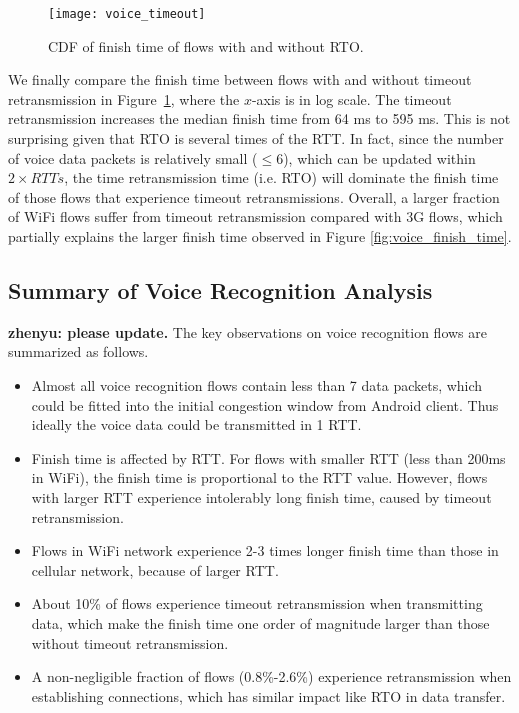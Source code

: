 \begin{figure}[th]
\centering
	\texttt{[image: voice\_timeout]}
\caption{CDF of finish time of flows with and without RTO.}
\label{fig:voice_rto}
\end{figure}

We finally compare the finish time between flows with and without timeout retransmission in Figure~\ref{fig:voice_rto}, where the $x$-axis is in log scale. The timeout retransmission increases the median finish time from 64 ms to 595 ms. This is not surprising given that RTO is several times of the RTT. In fact, since the number of voice data packets is relatively small ($\le 6$), which can be updated within $2\times RTTs$, the time retransmission time (i.e. RTO) will dominate the finish time of those flows that experience timeout retransmissions.  Overall, a larger fraction of WiFi flows suffer from timeout retransmission compared with 3G flows, which partially explains the larger finish time observed in Figure \ref{fig:voice_finish_time}.

\subsection{Summary of Voice Recognition Analysis}

\textbf{zhenyu: please update.}
The key observations on voice recognition flows are summarized as follows.
\begin{itemize}
	\item Almost all voice recognition flows contain less than 7 data packets, which could be fitted into the initial congestion window from Android client. Thus ideally the voice data could be transmitted in 1 RTT.
	\item Finish time is affected by RTT. For flows with smaller RTT (less than 200ms in WiFi), the finish time is proportional to the RTT value. However, flows with larger RTT experience intolerably long finish time, caused by timeout retransmission.
	\item Flows in WiFi network experience 2-3 times longer finish time than those in cellular network, because of larger RTT.
	\item About 10\% of flows experience timeout retransmission when transmitting data, which make the finish time one order of magnitude larger than those without timeout retransmission.
	\item A non-negligible fraction of flows (0.8\%-2.6\%) experience retransmission when establishing connections, which has similar impact like RTO in data transfer.
\end{itemize}
